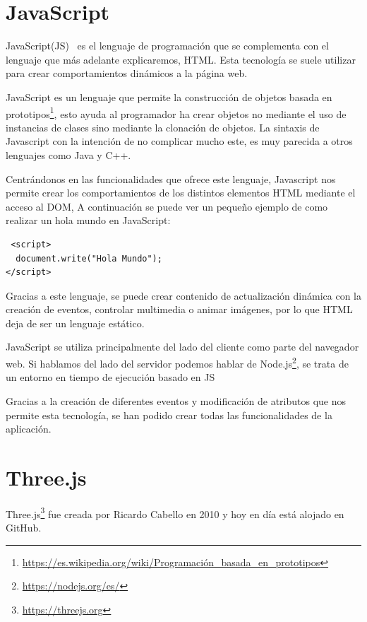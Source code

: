 \documentclass[a4paper, 12pt]{book}
\begin{document}
\section{JavaScript} %
\label{sec:JavaScript}

JavaScript(JS)~\cite{eloquent} es el lenguaje de programación que se complementa con el lenguaje que más adelante explicaremos, HTML. Esta tecnología se suele utilizar para crear comportamientos dinámicos a la página web.

JavaScript es un lenguaje que permite la construcción de objetos basada en prototipos\footnote{\url{https://es.wikipedia.org/wiki/Programación_basada_en_prototipos}}, esto ayuda al programador ha crear objetos no mediante el uso de  instancias de clases sino mediante la clonación de objetos. La sintaxis de Javascript con la intención de no complicar mucho este, es muy parecida a otros lenguajes como Java y C++.

Centrándonos en las funcionalidades que ofrece este lenguaje, Javascript nos permite crear los comportamientos de los distintos elementos  HTML mediante el acceso al DOM, A continuación se puede ver un pequeño ejemplo de como realizar un hola mundo en JavaScript:

\begin{verbatim}
 <script>
  document.write("Hola Mundo");
</script>   
\end{verbatim}

Gracias a este lenguaje, se puede crear contenido de actualización dinámica con la creación de eventos, controlar multimedia o animar imágenes, por lo que HTML deja de ser un lenguaje estático.

JavaScript se utiliza principalmente del lado del cliente como parte del navegador web. Si hablamos del lado del servidor podemos hablar de Node.js\footnote{\url{https://nodejs.org/es/}}, se trata de un entorno  en tiempo de ejecución basado en JS

Gracias a la creación de diferentes eventos y  modificación de atributos  que nos permite esta tecnología, se han podido crear todas las funcionalidades de la aplicación.

\section{Three.js} %
\label{sec:Three}
Three.js\footnote{\url{https://threejs.org}} fue creada por Ricardo Cabello en 2010 y hoy en día está alojado en GitHub.
\end{document}
